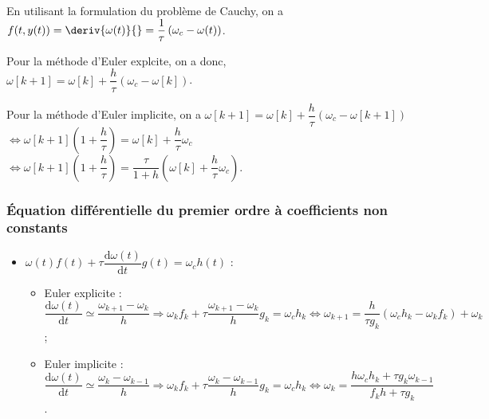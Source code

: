 En utilisant la formulation du problème de Cauchy, on a $f(t,y(t)) = \deriv{\omega(t)}{} = \dfrac{1}{\tau}\left(\omega_c - \omega(t)\right)$.




Pour la méthode d'Euler explcite, on a donc, $\omega[k+1]=\omega[k]+\dfrac{h}{\tau}\left(\omega_c - \omega[k]\right)$.



Pour la méthode d'Euler implicite, on a $\omega[k+1]=\omega[k]+\dfrac{h}{\tau}\left(\omega_c - \omega[k+1]\right)$ 
$\Leftrightarrow \omega[k+1] \left(1+\dfrac{h}{\tau}\right) =\omega[k] + \dfrac{h}{\tau}\omega_c$ 
$\Leftrightarrow \omega[k+1] \left(1+\dfrac{h}{\tau}\right) =\dfrac{\tau}{1+h}\left(\omega[k] + \dfrac{h}{\tau}\omega_c\right)$.


\subsubsection{Équation différentielle du premier ordre à coefficients non constants}

\begin{itemize}[label=,font=\color{red}] 
\item   $\omega(t) f(t) + \tau \dfrac{\text{d} \omega(t)}{\text{d}t} g(t)  = \omega_c h(t)$ :
\begin{itemize}
\item Euler explicite : $\dfrac{\text{d} \omega(t)}{\text{d}t}\simeq \dfrac{\omega_{k+1}-\omega_k}{h} \Rightarrow  \omega_k f_k+ \tau  \dfrac{\omega_{k+1}-\omega_k}{h} g_k= \omega_c h_k  \Leftrightarrow \omega_{k+1} =\dfrac{h}{\tau g_k} \left(\omega_c h_k - \omega_k f_k \right)+\omega_k$;
\item Euler implicite : $\dfrac{\text{d} \omega(t)}{\text{d}t}\simeq \dfrac{\omega_{k}-\omega_{k-1}}{h} \Rightarrow  \omega_k f_k+ \tau \dfrac{\omega_{k}-\omega_{k-1}}{h} g_k= \omega_c h_k  \Leftrightarrow \omega_k =  \dfrac{h\omega_c h_k +\tau g_k\omega_{k-1}}{f_k h+   \tau g_k}  $.
\end{itemize}
\end{itemize}


